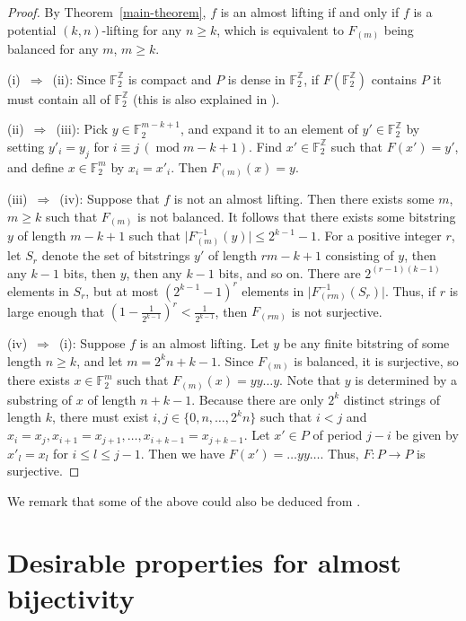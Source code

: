 \documentclass[11pt,english,a4paper]{amsart}
\theoremstyle{plain}
\theoremstyle{definition}
\theoremstyle{remark}
\newcommand{\Z}{\mathbb{Z}}
\newcommand{\F}{\mathbb{F}}
\begin{document}
	\begin{proof}
		By Theorem~\ref{main-theorem}, $f$ is an almost lifting if and only if $f$ is a potential $(k, n)$-lifting for any $n \geq k$, which is equivalent to $F_{(m)}$ being balanced for any $m$, $m \geq k$.
		
		(i)~$\Longrightarrow$~(ii):
		Since $\F_2^\Z$ is compact and $P$ is dense in $\F_2^\Z$, if $F(\F_2^\Z)$ contains $P$ it must contain all of $\F_2^\Z$ (this is also explained in \cite[Theorem~5 and~6]{schoone-daemen}).
		
		(ii)~$\Longrightarrow$~(iii):
		Pick $y\in \F_2^{m-k+1}$, and expand it to an element of $y'\in\F_2^\Z$ by setting $y'_i = y_j$ for $i \equiv j\, (\operatorname{mod} m-k+1)$. Find $x'\in\F_2^\Z$ such that $F(x')=y'$, and define $x\in\F_2^m$ by $x_i=x'_i$. 
		Then $F_{(m)}(x)=y$.
		
		(iii)~$\Longrightarrow$~(iv):
		Suppose that $f$ is not an almost lifting. Then there exists some $m$, $m \geq k$ such that $F_{(m)}$ is not balanced. It follows that there exists some bitstring $y$ of length $m-k+1$ such that $\lvert F_{(m)}^{-1}(y) \rvert \leq 2^{k-1}-1$. For a positive integer $r$, let $S_r$ denote the set of bitstrings $y'$ of length $rm-k+1$ consisting of $y$, then any $k-1$ bits, then $y$, then any $k-1$ bits, and so on. There are $2^{(r-1)(k-1)}$ elements in $S_r$, but at most $\left(2^{k-1} - 1\right)^r$ elements in $\lvert F_{(rm)}^{-1}(S_r) \rvert$. Thus, if $r$ is large enough that $\left(1 - \frac{1}{2^{k-1}} \right)^r < \frac{1}{2^{k-1}}$, then $F_{(rm)}$ is not surjective.
		
		(iv)~$\Longrightarrow$~(i):
		Suppose $f$ is an almost lifting. Let $y$ be any finite bitstring of some length $n \geq k$, and let $m=2^k n+k-1$. Since $F_{(m)}$ is balanced, it is surjective, so there exists $x \in \F_2^m$ such that $F_{(m)}(x)=yy \dotsc y$. Note that $y$ is determined by a substring of $x$ of length $n+k-1$. Because there are only $2^k$ distinct strings of length $k$, there must exist $i, j \in \{0, n, \dotsc, 2^k n\}$ such that $i<j$ and $x_i = x_j, x_{i+1} = x_{j+1}, \dotsc, x_{i+k-1} = x_{j+k-1}$. Let $x' \in P$ of period $j-i$ be given by $x'_l = x_l$ for $i \leq l \leq j - 1$. Then we have
		$F(x')=\dotsc y y \dotsc$. Thus, $F\colon P \to P$ is surjective.
	\end{proof}
	
	We remark that some of the above could also be deduced from \cite[Section~5]{hedlund}.
	
	
	\section{Desirable properties for almost bijectivity}
	
\end{document}
